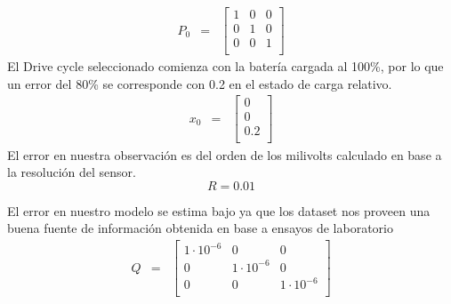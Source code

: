 \documentclass[10pt,a4paper]{article}
\begin{document}
	\begin{equation}
		\begin{array}{llll}
			P_0 & = & \begin{bmatrix}
				1 & 0 & 0 \\
				0 & 1 & 0 \\
				0 & 0 & 1 \\
			\end{bmatrix} 
		\end{array} \nonumber
	\end{equation}
	El Drive cycle seleccionado comienza con la batería cargada al 100\%, por lo que un error del 80\% se corresponde con 0.2 en el estado de carga relativo.
	\begin{equation}
		\begin{array}{llll}
			x_0 & = & \begin{bmatrix}
				0 \\
				0 \\
				0.2 \\
			\end{bmatrix} 
		\end{array} \nonumber
	\end{equation}
	El error en nuestra observación es del orden de los milivolts calculado en base a la resolución del sensor.
	\begin{equation}
		R = 0.01  \nonumber
	\end{equation}
	
	El error en nuestro modelo se estima bajo ya que los dataset nos proveen una buena fuente de información obtenida en base a ensayos de laboratorio
	\begin{equation}
		\begin{array}{llll}
			Q & = & \begin{bmatrix}
				1\cdot10^{-6} & 0 & 0 \\
				0 & 1\cdot10^{-6} & 0 \\
				0 & 0 & 1\cdot10^{-6} \\
			\end{bmatrix} 
		\end{array} \nonumber
	\end{equation}
	
	\clearpage
	
\end{document}
